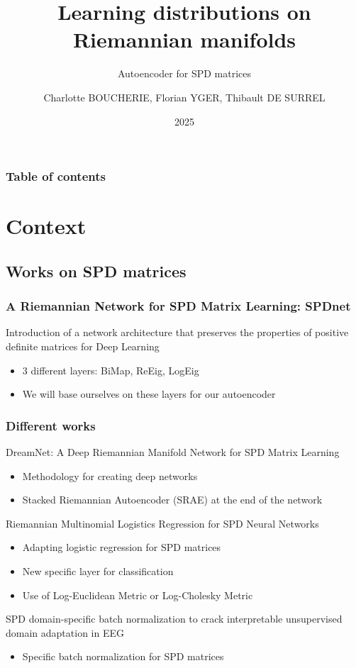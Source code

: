 \documentclass{beamer}
\title[AE SPDnet]
{Learning distributions on Riemannian manifolds}
\subtitle{Autoencoder for SPD matrices}
\author[CB]
{Charlotte BOUCHERIE, Florian YGER, Thibault DE SURREL}
\institute{LITIS}
\date[2025]
{2025}
\begin{document}
\frame{\titlepage}

\begin{frame}
\frametitle{Table of contents}
\tableofcontents
\end{frame}

\section{Context}
\subsection{Works on SPD matrices}
\begin{frame}
\frametitle{A Riemannian Network for SPD Matrix Learning: SPDnet}
Introduction of a network architecture that preserves the properties of positive definite matrices for Deep Learning \cite{DBLP:journals/corr/HuangG16}
\begin{itemize}
    \item 3 different layers: BiMap, ReEig, LogEig
    \item We will base ourselves on these layers for our autoencoder    
\end{itemize}

\end{frame}
\begin{frame}
    \frametitle{Different works}
    DreamNet: A Deep Riemannian Manifold Network for SPD Matrix Learning \cite{wang2022dreamnetdeepriemanniannetwork}
    \begin{itemize}
        \item Methodology for creating deep networks
        \item Stacked Riemannian Autoencoder (SRAE) at the end of the network
    \end{itemize}
    Riemannian Multinomial Logistics Regression for SPD Neural Networks \cite{chen2024riemannianmultinomiallogisticsregression}
    \begin{itemize}
        \item Adapting logistic regression for SPD matrices
        \item New specific layer for classification
        \item Use of Log-Euclidean Metric or Log-Cholesky Metric
    \end{itemize}
    SPD domain-specific batch normalization to crack interpretable unsupervised domain adaptation in EEG \cite{kobler2022spddomainspecificbatchnormalization}
    \begin{itemize}
        \item Specific batch normalization for SPD matrices
    \end{itemize}
\end{frame}
\end{document}
